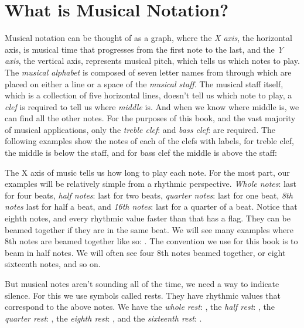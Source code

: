 \section{What is Musical Notation?}
Musical notation can be thought of as a graph, where the \emph{X axis}, the horizontal axis, is musical time that progresses from the first note to the last, and the \emph{Y axis}, the vertical axis, represents musical pitch, which tells us which notes to play. The \emph{musical alphabet} is composed of seven letter names from  through  which are placed on either a line or a space of the \emph{musical staff}. The musical staff itself, which is a collection of five horizontal lines, doesn't tell us which note to play, a \emph{clef} is required to tell us where \emph{middle } is. And when we know where middle  is, we can find all the other notes. For the purposes of this book, and the vast majority of musical applications, only the \emph{treble clef}: \clefG{} and \emph{bass clef}: \clefF{} are required. The following examples show the notes of each of the clefs with labels, for treble clef, the middle  is below the staff, and for bass clef the middle  is above the staff:



The X axis of music tells us how long to play each note. For the most part, our examples will be relatively simple from a rhythmic perspective. \emph{Whole notes}: \wholeNote{} last for four beats, \emph{half notes}: \halfNote{} last for two beats, \emph{quarter notes}: \quarterNote{} last for one beat, \emph{8th notes} \eighthNote{} last for half a beat, and \emph{16th notes}: \sixteenthNote{} last for a quarter of a beat. Notice that eighth notes, and every rhythmic value faster than that has a flag. They can be beamed together if they are in the same beat. We will see many examples where 8th notes are beamed together like so: \twoBeamedQuavers{}. The convention we use for this book is to beam in half notes. We will often see four 8th notes beamed together, or eight sixteenth notes, and so on.

But musical notes aren't sounding all of the time, we need a way to indicate silence. For this we use symbols called rests. They have rhythmic values that correspond to the above notes. We have the \emph{whole rest}: \wholeRest{}, the \emph{half rest}: \halfRest{}, the \emph{quarter rest}: \quarterRest{}, the \emph{eighth rest}: \eighthRest{}, and the \emph{sixteenth rest}: \sixteenthRest{}.

